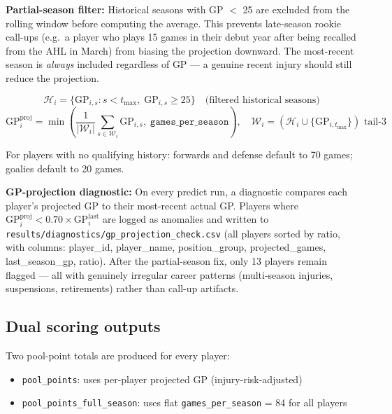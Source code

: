 \documentclass[11pt, a4paper]{article}
\begin{document}
\textbf{Partial-season filter:} Historical seasons with GP $<$ 25 are excluded from the rolling
window before computing the average. This prevents late-season rookie call-ups (e.g.\ a player
who plays 15 games in their debut year after being recalled from the AHL in March) from biasing
the projection downward. The most-recent season is \emph{always} included regardless of GP —
a genuine recent injury should still reduce the projection.

\begin{equation}
  \mathcal{H}_i = \{\text{GP}_{i,s} : s < t_{\max},\; \text{GP}_{i,s} \geq 25\}
  \quad\text{(filtered historical seasons)}
\end{equation}
\begin{equation}
  \text{GP}_i^{\text{proj}} = \min\!\left(\frac{1}{|\mathcal{W}_i|}\sum_{s \in \mathcal{W}_i}
  \text{GP}_{i,s},\; \texttt{games\_per\_season}\right),
  \quad \mathcal{W}_i = (\mathcal{H}_i \cup \{\text{GP}_{i,t_{\max}}\})\text{ tail-3}
\end{equation}

For players with no qualifying history: forwards and defense default to 70 games; goalies default
to 20 games.

\textbf{GP-projection diagnostic:} On every predict run, a diagnostic compares each player's
projected GP to their most-recent actual GP. Players where
$\text{GP}^{\text{proj}}_i < 0.70 \times \text{GP}^{\text{last}}_i$
are logged as anomalies and written to \texttt{results/diagnostics/gp\_projection\_check.csv}
(all players sorted by ratio, with columns: player\_id, player\_name, position\_group,
projected\_games, last\_season\_gp, ratio). After the partial-season fix, only 13 players
remain flagged — all with genuinely irregular career patterns (multi-season injuries,
suspensions, retirements) rather than call-up artifacts.

\subsection{Dual scoring outputs}

Two pool-point totals are produced for every player:

\begin{itemize}[leftmargin=*]
  \item \texttt{pool\_points}: uses per-player projected GP (injury-risk-adjusted)
  \item \texttt{pool\_points\_full\_season}: uses flat \texttt{games\_per\_season} = 84 for all players
\end{itemize}
\end{document}

